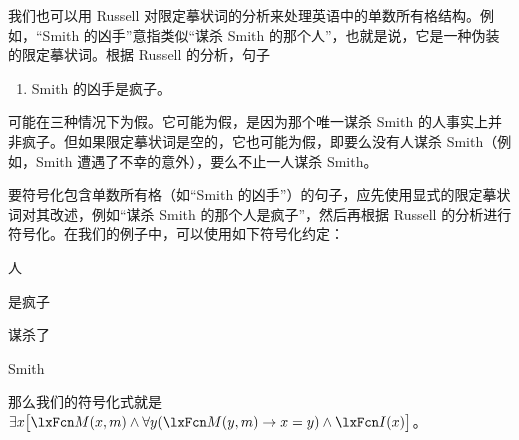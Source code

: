 我们也可以用 Russell 对限定摹状词的分析来处理英语中的单数所有格结构。例如，“Smith 的凶手”意指类似“谋杀 Smith 的那个人”，也就是说，它是一种伪装的限定摹状词。根据 Russell 的分析，句子
\begin{enumerate}
	\item\label{smithsmurder} Smith 的凶手是疯子。
\end{enumerate}
可能在三种情况下为假。它可能为假，是因为那个唯一谋杀 Smith 的人事实上并非疯子。但如果限定摹状词是空的，它也可能为假，即要么没有人谋杀 Smith（例如，Smith 遭遇了不幸的意外），要么不止一人谋杀 Smith。

要符号化包含单数所有格（如“Smith 的凶手”）的句子，应先使用显式的限定摹状词对其改述，例如“谋杀 Smith 的那个人是疯子”，然后再根据 Russell 的分析进行符号化。在我们的例子中，可以使用如下符号化约定：
\begin{ekey}
	\item[\text{论域}] 人
	\item[\atom{I}{x}]  是疯子
	\item[\atom{M}{x,y}]  谋杀了 
	\item[m] Smith
\end{ekey}
那么我们的符号化式就是 $\exists x\bigl[\atom{M}{x,m} \eand \forall y(\atom{M}{y,m} \eif x=y) \eand \atom{I}{x}\bigr]$。

